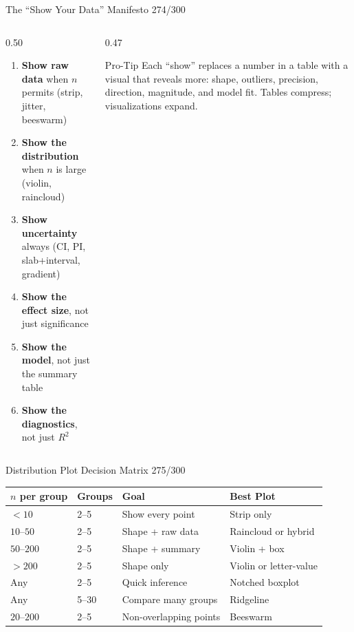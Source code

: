 \documentclass[10pt]{beamer}
\newcommand{\smark}[1]{\hfill{\scriptsize\color{codegray}#1}}
\begin{document}
\begin{frame}{The ``Show Your Data'' Manifesto}
\smark{274/300}
\begin{columns}[T]
\begin{column}{0.50\textwidth}
\begin{enumerate}
    \item \textbf{Show raw data} when $n$ permits (strip, jitter, beeswarm)
    \item \textbf{Show the distribution} when $n$ is large (violin, raincloud)
    \item \textbf{Show uncertainty} always (CI, PI, slab+interval, gradient)
    \item \textbf{Show the effect size}, not just significance
    \item \textbf{Show the model}, not just the summary table
    \item \textbf{Show the diagnostics}, not just $R^2$
\end{enumerate}
\end{column}
\begin{column}{0.47\textwidth}
\begin{alertblock}{Pro-Tip}
    \scriptsize Each ``show'' replaces a number in a table with a visual that reveals more: shape, outliers, precision, direction, magnitude, and model fit. Tables compress; visualizations expand.
\end{alertblock}
\end{column}
\end{columns}
\end{frame}

\begin{frame}{Distribution Plot Decision Matrix}
\smark{275/300}
\centering\small
\begin{tabular}{@{}llll@{}}
    \toprule
    \textbf{$n$ per group} & \textbf{Groups} & \textbf{Goal} & \textbf{Best Plot} \\
    \midrule
    $< 10$        & 2--5    & Show every point        & Strip only \\
    $10$--$50$    & 2--5    & Shape + raw data        & Raincloud or hybrid \\
    $50$--$200$   & 2--5    & Shape + summary         & Violin + box \\
    $> 200$       & 2--5    & Shape only              & Violin or letter-value \\
    Any           & 2--5    & Quick inference         & Notched boxplot \\
    Any           & 5--30   & Compare many groups     & Ridgeline \\
    $20$--$200$   & 2--5    & Non-overlapping points  & Beeswarm \\
    \bottomrule
\end{tabular}
\end{frame}
\end{document}
